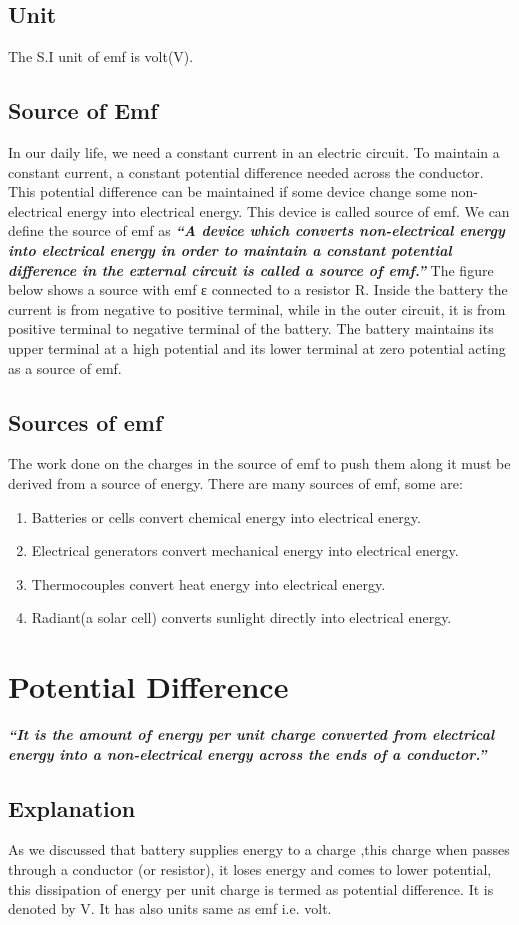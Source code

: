 \subsection*{Unit}
The S.I unit of emf is volt(V).
\subsection*{Source of Emf}
In our daily life, we need a constant current in an electric circuit. To maintain a constant current, a constant potential difference needed across the conductor. This potential difference can be maintained if some device change some non-electrical energy into electrical energy. This device is called source of emf. We can define the source of emf as
\textit{\textbf{``A device which converts non-electrical energy into electrical energy in order to maintain a constant potential difference in the external circuit is called a source of emf.”}}
The figure below shows a source with emf ε connected to a resistor R. Inside the battery the current is from negative to positive terminal, while in the outer circuit, it is from positive terminal to negative terminal of the battery. The battery maintains its upper terminal at a high potential and its lower terminal at zero potential acting as a source of emf.
\subsection*{Sources of emf}
The work done on the charges in the source of emf to push them along it must be derived  from a source of energy. There are many sources of emf, some are:
\begin{enumerate}[label=(\roman*)]
\item Batteries or cells convert chemical energy into electrical energy.
\item Electrical generators convert mechanical energy into electrical energy.
\item Thermocouples convert heat energy into electrical energy.
\item Radiant(a solar cell) converts sunlight directly into electrical energy.
\end{enumerate}
\section{Potential Difference}
\textit{\textbf{``It is the amount of energy per unit charge converted from electrical energy into a non-electrical energy across the ends of a conductor.”}}
\subsection*{Explanation}
As we discussed that battery supplies energy to a charge ,this charge when passes through a conductor (or resistor), it loses energy and comes to lower potential, this dissipation of energy per unit charge is termed as potential difference. It is denoted by V. It has also units same as emf i.e. volt.
